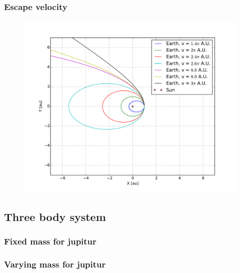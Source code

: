 \subsubsection{Escape velocity}


\begin{figure}[H]
    \centering
    \includegraphics[width=\linewidth]{result/bilder/escape-velocity.pdf}
    \caption{ }
    \label{fig:escape-velocity}
\end{figure}








\subsection{Three body system}

\subsubsection{Fixed mass for jupitur}


\subsubsection{Varying mass for jupitur}




